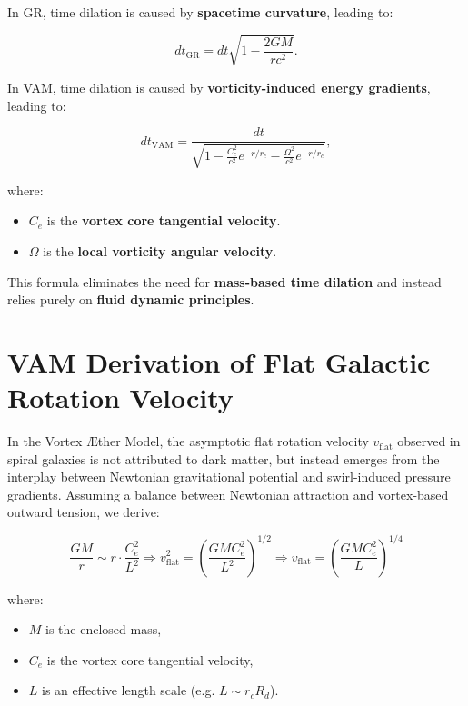 In GR, time dilation is caused by \textbf{spacetime curvature}, leading to:

\begin{equation*}
    dt_\text{GR} = dt \sqrt{1 - \frac{2GM}{rc^2}}.
\end{equation*}

In VAM, time dilation is caused by \textbf{vorticity-induced energy gradients}, leading to:

\begin{equation*}
    dt_\text{VAM} = \frac{dt}{\sqrt{1 - \frac{C_e^2}{c^2} e^{-r/r_c} - \frac{\Omega^2}{c^2} e^{-r/r_c}}},
\end{equation*}

where:
\begin{itemize}
    \item  \( C_e \) is the \textbf{vortex core tangential velocity}.
    \item  \( \Omega \) is the \textbf{local vorticity angular velocity}.
\end{itemize}


This formula eliminates the need for \textbf{mass-based time dilation} and instead relies purely on \textbf{fluid dynamic principles}.


    \section{VAM Derivation of Flat Galactic Rotation Velocity}

    In the Vortex \AE{}ther Model, the asymptotic flat rotation velocity $v_{\text{flat}}$ observed in spiral galaxies is not attributed to dark matter, but instead emerges from the interplay between Newtonian gravitational potential and swirl-induced pressure gradients. Assuming a balance between Newtonian attraction and vortex-based outward tension, we derive:

    \[
        \frac{G M}{r} \sim r \cdot \frac{C_e^2}{L^2} \Rightarrow
        v_{\text{flat}}^2 = \left( \frac{G M C_e^2}{L^2} \right)^{1/2} \Rightarrow
        \boxed{v_{\text{flat}} = \left( \frac{G M C_e^2}{L} \right)^{1/4}}
    \]

    where:
    \begin{itemize}
        \item  $M$ is the enclosed mass,
        \item  $C_e$ is the vortex core tangential velocity,
        \item  $L$ is an effective length scale (e.g. $L \sim r_c R_d$).
    \end{itemize}

